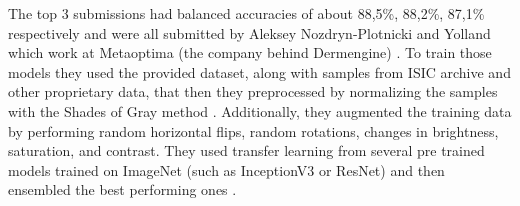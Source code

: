 The top 3 submissions had balanced accuracies of about 88,5\%, 88,2\%, 87,1\% respectively and were all submitted by Aleksey Nozdryn-Plotnicki and Yolland which work at Metaoptima (the company behind Dermengine) \cite{isic2018top3}. To train those models they used the provided dataset, along with samples from ISIC archive and other proprietary data, that then they preprocessed by normalizing the samples with the Shades of Gray method \cite{shadesgray}. Additionally, they augmented the training data by performing random horizontal flips, random rotations, changes in brightness, saturation, and contrast. They used transfer learning from several pre trained models trained on ImageNet (such as InceptionV3 or ResNet) and then ensembled the best performing ones \cite{isic2018top3}. \par


